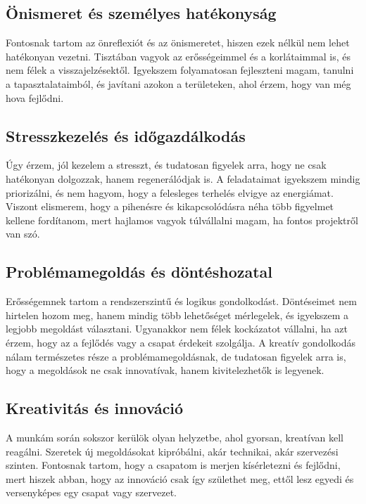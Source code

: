 \subsection{Önismeret és személyes hatékonyság}

Fontosnak tartom az önreflexiót és az önismeretet, hiszen ezek nélkül nem lehet hatékonyan vezetni.
Tisztában vagyok az erősségeimmel és a korlátaimmal is, és nem félek a visszajelzésektől.
Igyekszem folyamatosan fejleszteni magam, tanulni a tapasztalataimból, 
és javítani azokon a területeken, ahol érzem, hogy van még hova fejlődni.

\subsection{Stresszkezelés és időgazdálkodás}

Úgy érzem, jól kezelem a stresszt, és tudatosan figyelek arra, hogy ne csak hatékonyan dolgozzak, hanem regenerálódjak is.
A feladataimat igyekszem mindig priorizálni, és nem hagyom, hogy a felesleges terhelés elvigye az energiámat.
Viszont elismerem, hogy a pihenésre és kikapcsolódásra néha több 
figyelmet kellene fordítanom, mert hajlamos vagyok túlvállalni magam, ha fontos projektről van szó.

\subsection{Problémamegoldás és döntéshozatal}

Erősségemnek tartom a rendszerszintű és logikus gondolkodást.
Döntéseimet nem hirtelen hozom meg, hanem mindig több lehetőséget mérlegelek, és igyekszem a legjobb megoldást választani.
Ugyanakkor nem félek kockázatot vállalni, ha azt érzem, hogy az a fejlődés vagy a csapat érdekeit szolgálja.
A kreatív gondolkodás nálam természetes része a problémamegoldásnak, de tudatosan figyelek arra is, 
hogy a megoldások ne csak innovatívak, hanem kivitelezhetők is legyenek.

\subsection{Kreativitás és innováció}

A munkám során sokszor kerülök olyan helyzetbe, ahol gyorsan, kreatívan kell reagálni.
Szeretek új megoldásokat kipróbálni, akár technikai, akár szervezési szinten.
Fontosnak tartom, hogy a csapatom is merjen kísérletezni és fejlődni, mert hiszek abban, 
hogy az innováció csak így születhet meg, ettől lesz egyedi és versenyképes egy csapat vagy szervezet.

